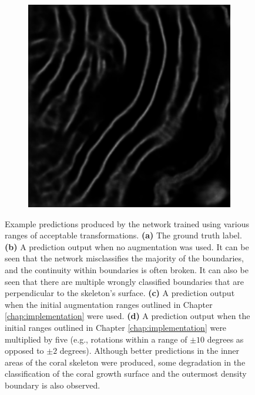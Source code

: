 \begin{figure}[!t]
\begin{subfigure}[t]{0.24\textwidth}
        \caption{}
    \end{subfigure}
    \begin{subfigure}[t]{0.24\textwidth}
        \centering
        \includegraphics[width=1\textwidth, valign=c]{images/aug-rotation.png}
        \caption{}
    \end{subfigure}
    \caption{Example predictions produced by the network trained using various ranges of acceptable transformations. \textbf{(a)} The ground truth label. \textbf{(b)} A prediction output when no augmentation was used. It can be seen that the network misclassifies the majority of the boundaries, and the continuity within boundaries is often broken. It can also be seen that there are multiple wrongly classified boundaries that are perpendicular to the skeleton's surface. \textbf{(c)} A prediction output when the initial augmentation ranges outlined in Chapter \ref{chap:implementation} were used. \textbf{(d)} A prediction output when the initial ranges outlined in Chapter \ref{chap:implementation} were multiplied by five (e.g., rotations within a range of $\pm 10$ degrees as opposed to $\pm 2$ degrees). Although better predictions in the inner areas of the coral skeleton were produced, some degradation in the classification of the coral growth surface and the outermost density boundary is also observed.}
    \label{fig:evalaugmentation}
\end{figure}

